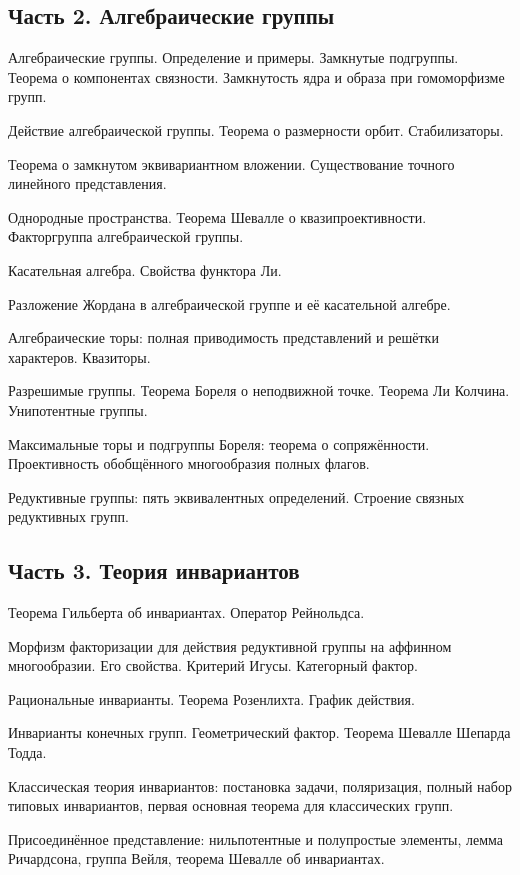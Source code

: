 \documentclass[a4paper]{article}
\begin{document}
\subsection*{Часть 2. Алгебраические группы}

\begin{nums}{0}
\item Алгебраические группы. Определение и примеры. Замкнутые подгруппы. Теорема о компонентах связности.
Замкнутость ядра и образа при гомоморфизме групп.
\item Действие алгебраической группы. Теорема о размерности орбит. Стабилизаторы.
\item Теорема о замкнутом эквивариантном вложении. Существование точного линейного представления.
\item Однородные пространства. Теорема Шевалле о квазипроективности. Факторгруппа алгебраической группы.
\item Касательная алгебра. Свойства функтора Ли.
\item Разложение Жордана в алгебраической группе и её касательной алгебре.
\item Алгебраические торы: полная приводимость представлений и решётки характеров. Квазиторы.
\item Разрешимые группы.  Теорема Бореля о неподвижной точке. Теорема Ли Колчина. Унипотентные группы.
\item Максимальные торы и подгруппы Бореля: теорема о сопряжённости. Проективность обобщённого многообразия полных флагов.
\item Редуктивные группы: пять эквивалентных определений. Строение связных редуктивных групп.
\end{nums}

\subsection*{Часть 3. Теория инвариантов}

\begin{nums}{0}
\item Теорема Гильберта об инвариантах. Оператор Рейнольдса.
\item Морфизм факторизации для действия редуктивной группы на аффинном многообразии. Его свойства. Критерий Игусы.
Категорный фактор.
\item  Рациональные инварианты. Теорема Розенлихта. График действия.
\item Инварианты конечных групп. Геометрический фактор. Теорема Шевалле Шепарда Тодда.
\item Классическая теория инвариантов: постановка задачи, поляризация, полный набор типовых инвариантов,
первая основная теорема для классических групп.
\item Присоединённое представление: нильпотентные и полупростые элементы, лемма Ричардсона, группа Вейля, теорема Шевалле об инвариантах.
\end{nums}

\medskip\dmvntrail
\end{document}
